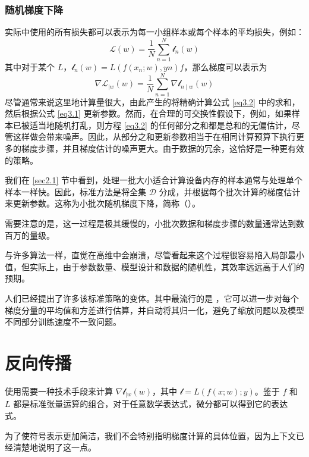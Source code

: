 \subsubsection*{随机梯度下降}

实际中使用的所有损失都可以表示为每一小组样本或每个样本的平均损失，例如：
\[\mathcal{L}(w) = \frac{1}{N} \sum_{n=1}^{N} \mathcal{l}_n(w)\]
其中对于某个 $L$，$\mathcal{l}_n(w) = L(f(x_n;w),yn) f$，那么梯度可以表示为
\begin{equation}
    \nabla \mathcal{L}_{\mid w}(w) = \frac{1}{N} \sum_{n=1}^{N} \nabla \mathcal{l}_{n \mid w}(w)\label{eq3.2}
\end{equation}
尽管通常来说这里地计算量很大，由此产生的将精确计算公式 \ref{eq3.2} 中的求和，然后根据公式 \ref{eq3.1} 更新参数。然而，在合理的可交换性假设下，例如，如果样本已被适当地随机打乱，则方程 \ref{eq3.2} 的任何部分之和都是总和的无偏估计，尽管这样做会带来噪声。因此，从部分之和更新参数相当于在相同计算预算下执行更多的梯度步骤，并且梯度估计的噪声更大。由于数据的冗余，这恰好是一种更有效的策略。

我们在 \ref{sec2.1} 节中看到，处理一批大小适合计算设备内存的样本通常与处理单个样本一样快。因此，标准方法是将全集 $\mathcal{D}$ 分成，并根据每个批次计算的梯度估计来更新参数。这称为小批次随机梯度下降，简称（）。

需要注意的是，这一过程是极其缓慢的，小批次数据和梯度步骤的数量通常达到数百万的量级。

与许多算法一样，直觉在高维中会崩溃，尽管看起来这个过程很容易陷入局部最小值，但实际上，由于参数数量、模型设计和数据的随机性，其效率远远高于人们的预期。

人们已经提出了许多该标准策略的变体。其中最流行的是 \citep{arxiv-1412.6980}，它可以进一步对每个梯度分量的平均值和方差进行估算，并自动将其归一化，避免了缩放问题以及模型不同部分训练速度不一致问题。

\section{反向传播}

使用需要一种技术手段来计算 $\nabla \mathcal{l}_{\mid w}(w)$，其中 $\mathcal{l} = L(f(x;w);y)$。鉴于 $f$ 和 $L$ 都是标准张量运算的组合，对于任意数学表达式，微分都可以得到它的表达式。

为了使符号表示更加简洁，我们不会特别指明梯度计算的具体位置，因为上下文已经清楚地说明了这一点。

